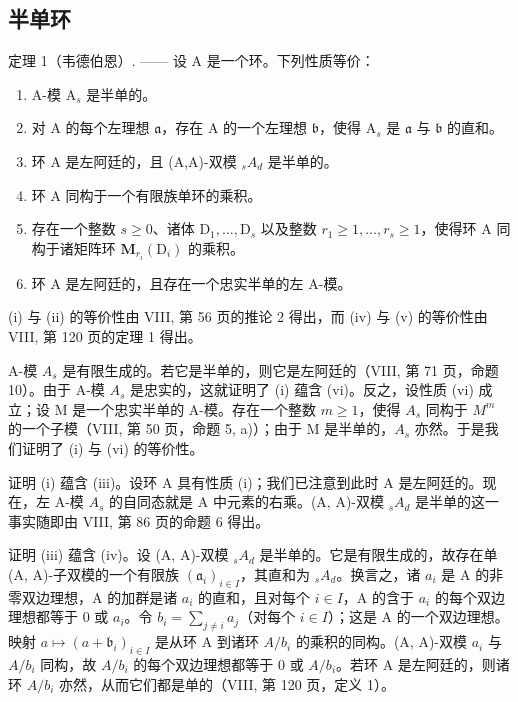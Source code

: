 \subsection{半单环}

定理 1（韦德伯恩）. —— 设 A 是一个环。下列性质等价：

\begin{enumerate}
\def\labelenumi{(\roman{enumi})}
\item
  A-模 \(\mathrm{A}_s\) 是半单的。
\item
  对 A 的每个左理想 \(\mathfrak{a}\)，存在 A 的一个左理想 \(\mathfrak{b}\)，使得 \(\mathrm{A}_s\) 是 \(\mathfrak{a}\) 与 \(\mathfrak{b}\) 的直和。
\item
  环 A 是左阿廷的，且 (A,A)-双模 \(_{s}A_{d}\) 是半单的。
\item
  环 A 同构于一个有限族单环的乘积。
\item
  存在一个整数 \(s \geqslant 0\)、诸体 \(\mathrm{D}_1, \ldots, \mathrm{D}_s\) 以及整数 \(r_1 \geqslant 1, \ldots, r_s \geqslant 1\)，使得环 A 同构于诸矩阵环 \(\mathbf{M}_{r_i}(\mathrm{D}_i)\) 的乘积。
\item
  环 A 是左阿廷的，且存在一个忠实半单的左 A-模。
\end{enumerate}

(i) 与 (ii) 的等价性由 VIII, 第 56 页的推论 2 得出，而 (iv) 与 (v) 的等价性由 VIII, 第 120 页的定理 1 得出。

A-模 \(A_{s}\) 是有限生成的。若它是半单的，则它是左阿廷的（VIII, 第 71 页，命题 10）。由于 A-模 \(A_{s}\) 是忠实的，这就证明了 (i) 蕴含 (vi)。反之，设性质 (vi) 成立；设 M 是一个忠实半单的 A-模。存在一个整数 \(m \geqslant 1\)，使得 \(A_{s}\) 同构于 \(M^{m}\) 的一个子模（VIII, 第 50 页，命题 5, a)）；由于 M 是半单的，\(A_{s}\) 亦然。于是我们证明了 (i) 与 (vi) 的等价性。

证明 (i) 蕴含 (iii)。设环 A 具有性质 (i)；我们已注意到此时 A 是左阿廷的。现在，左 A-模 \(A_{s}\) 的自同态就是 A 中元素的右乘。(A, A)-双模 \(_{s}A_{d}\) 是半单的这一事实随即由 VIII, 第 86 页的命题 6 得出。

证明 (iii) 蕴含 (iv)。设 (A, A)-双模 \(_{s}A_{d}\) 是半单的。它是有限生成的，故存在单 (A, A)-子双模的一个有限族 \((\mathfrak{a}_{i})_{i\in I}\)，其直和为 \(_{s}A_{d}\)。换言之，诸 \(a_{i}\) 是 A 的非零双边理想，A 的加群是诸 \(a_{i}\) 的直和，且对每个 \(i\in I\)，A 的含于 \(a_{i}\) 的每个双边理想都等于 0 或 \(a_{i}\)。令 \(b_{i}=\sum_{j\neq i}a_{j}\)（对每个 \(i\in I\)）；这是 A 的一个双边理想。映射 \(a\mapsto(a+\mathfrak{b}_{i})_{i\in I}\) 是从环 A 到诸环 \(A/b_{i}\) 的乘积的同构。(A, A)-双模 \(a_{i}\) 与 \(A/b_{i}\) 同构，故 \(A/b_{i}\) 的每个双边理想都等于 0 或 \(A/b_{i}\)。若环 A 是左阿廷的，则诸环 \(A/b_{i}\) 亦然，从而它们都是单的（VIII, 第 120 页，定义 1）。


